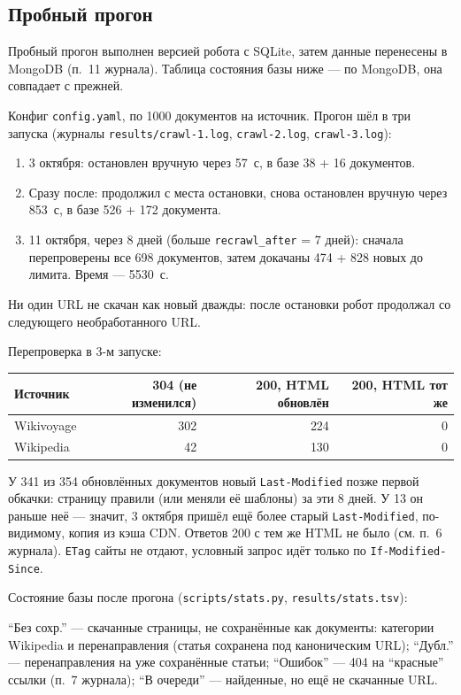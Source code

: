{\scriptsize
{}
}

\subsection{Пробный прогон}
Пробный прогон выполнен версией робота с SQLite, затем данные перенесены в MongoDB (п.~11 журнала). Таблица состояния базы ниже --- по MongoDB, она совпадает с прежней.

Конфиг \texttt{config.yaml}, по 1000 документов на источник. Прогон шёл в три запуска (журналы \texttt{results/crawl-1.log}, \texttt{crawl-2.log}, \texttt{crawl-3.log}):
\begin{enumerate}
    \item 3 октября: остановлен вручную через 57~с, в базе 38 + 16 документов.
    \item Сразу после: продолжил с места остановки, снова остановлен вручную через 853~с, в базе 526 + 172 документа.
    \item 11 октября, через 8 дней (больше \texttt{recrawl\_after} = 7 дней): сначала перепроверены все 698 документов, затем докачаны 474 + 828 новых до лимита. Время --- 5530~с.
\end{enumerate}
Ни один URL не скачан как новый дважды: после остановки робот продолжал со следующего необработанного URL.

Перепроверка в 3-м запуске:
\begin{center}
\begin{tabular}{|l|r|r|r|}
\hline
Источник & 304 (не изменился) & 200, HTML обновлён & 200, HTML тот же \\
\hline
Wikivoyage & 302 & 224 & 0 \\
\hline
Wikipedia & 42 & 130 & 0 \\
\hline
\end{tabular}
\end{center}
У 341 из 354 обновлённых документов новый \texttt{Last-Modified} позже первой обкачки: страницу правили (или меняли её шаблоны) за эти 8 дней. У 13 он раньше неё --- значит, 3 октября пришёл ещё более старый \texttt{Last-Modified}, по-видимому, копия из кэша CDN. Ответов 200 с тем же HTML не было (см. п.~6 журнала). \texttt{ETag} сайты не отдают, условный запрос идёт только по \texttt{If-Modified-Since}.

Состояние базы после прогона (\texttt{scripts/stats.py}, \texttt{results/stats.tsv}):
\begin{center}
\scriptsize

\end{center}
\enquote{Без сохр.} --- скачанные страницы, не сохранённые как документы: категории Wikipedia и перенаправления (статья сохранена под каноническим URL); \enquote{Дубл.} --- перенаправления на уже сохранённые статьи; \enquote{Ошибок} --- 404 на \enquote{красные} ссылки (п.~7 журнала); \enquote{В очереди} --- найденные, но ещё не скачанные URL.


